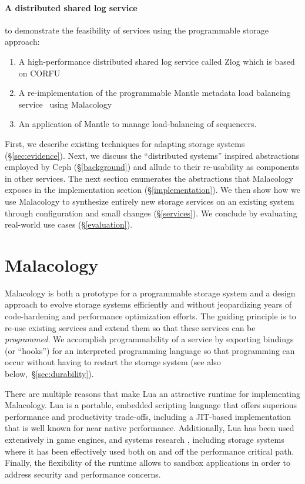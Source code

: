 \documentclass[10pt,twocolumn]{article}
\begin{document}
\paragraph*{A distributed shared log service} to demonstrate the feasibility of services using the programmable storage approach:

  \begin{enumerate}
  \item
    A high-performance distributed shared log service called Zlog which is based on CORFU~\cite{balakrishnan_corfu_2012}
  \item
    A re-implementation of the programmable Mantle metadata load balancing service~\cite{sevilla:sc15-mantle} using Malacology
  \item 
    An application of Mantle to manage load-balancing of sequencers.
  \end{enumerate}

First, we describe existing techniques for adapting storage systems
(\S\ref{sec:evidence}). Next, we discuss the ``distributed systems'' inspired
abstractions employed by Ceph (\S\ref{background}) and allude to their
re-usability as components in other services. The next section
enumerates the abstractions that Malacology exposes in the
implementation section (\S\ref{implementation}). We then show how we use
Malacology to synthesize entirely new storage services on an existing
system through configuration and small changes (\S\ref{services}). We
conclude by evaluating real-world use cases (\S\ref{evaluation}).

\section{Malacology}
\label{sec:malacology}

Malacology is both a prototype for a programmable storage system and a design approach to evolve storage systems efficiently and without
jeopardizing years of code-hardening and performance optimization
efforts. The guiding principle is to re-use existing services and extend them so that these services can be \emph{programmed}. We accomplish programmability of a service by exporting bindings (or ``hooks'') for an interpreted programming language so that programming can occur without having to restart the storage system (see also below,~\S\ref{sec:durability}). 

There are multiple reasons that make Lua an attractive runtime for implementing 
Malacology. Lua is a portable, embedded
scripting language that offers superious performance and productivity
trade-offs, including a JIT-based implementation that is well known for near
native performance. Additionally, Lua has been used extensively in game engines, 
and systems research \cite{neto:dls14-luaos}, including storage systems where it 
has been effectively used both on
\cite{grawinkel:pdsw2012-lua,watkins2013:bdmc13-in-vivo,geambasu_comet_2010} and 
off
\cite{sevilla:sc15-mantle} the performance critical path. Finally, the 
flexibility of the runtime allows to sandbox applications in order to address 
security and performance concerns.
\end{document}
